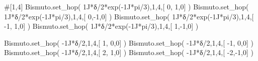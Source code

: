 \documentclass[
  letterpaper,
  DIV=11,
  numbers=noendperiod]{scrreprt}
\newenvironment{Shaded}{\begin{snugshade}}{\end{snugshade}}
\newcommand{\CommentTok}[1]{\textcolor[rgb]{0.37,0.37,0.37}{#1}}
\newcommand{\DecValTok}[1]{\textcolor[rgb]{0.68,0.00,0.00}{#1}}
\newcommand{\NormalTok}[1]{\textcolor[rgb]{0.00,0.23,0.31}{#1}}
\newcommand{\OperatorTok}[1]{\textcolor[rgb]{0.37,0.37,0.37}{#1}}
\newcommand{\OtherTok}[1]{\textcolor[rgb]{0.00,0.23,0.31}{#1}}
\begin{document}
\begin{Shaded}
\begin{Highlighting}[]
\CommentTok{\#[1,4]}
\NormalTok{Bismuto.set\_hop(  }\OtherTok{1J}\OperatorTok{*}\NormalTok{δ}\OperatorTok{/}\DecValTok{2}\OperatorTok{*}\NormalTok{exp(}\OperatorTok{{-}}\OtherTok{1J}\OperatorTok{*}\NormalTok{pi}\OperatorTok{/}\DecValTok{3}\NormalTok{),}\DecValTok{1}\NormalTok{,}\DecValTok{4}\NormalTok{,[  }\DecValTok{0}\NormalTok{, }\DecValTok{1}\NormalTok{,}\DecValTok{0}\NormalTok{] ) }
\NormalTok{Bismuto.set\_hop(  }\OtherTok{1J}\OperatorTok{*}\NormalTok{δ}\OperatorTok{/}\DecValTok{2}\OperatorTok{*}\NormalTok{exp(}\OperatorTok{{-}}\OtherTok{1J}\OperatorTok{*}\NormalTok{pi}\OperatorTok{/}\DecValTok{3}\NormalTok{),}\DecValTok{1}\NormalTok{,}\DecValTok{4}\NormalTok{,[  }\DecValTok{0}\NormalTok{,}\OperatorTok{{-}}\DecValTok{1}\NormalTok{,}\DecValTok{0}\NormalTok{] )}
\NormalTok{Bismuto.set\_hop(  }\OtherTok{1J}\OperatorTok{*}\NormalTok{δ}\OperatorTok{/}\DecValTok{2}\OperatorTok{*}\NormalTok{exp(}\OperatorTok{{-}}\OtherTok{1J}\OperatorTok{*}\NormalTok{pi}\OperatorTok{/}\DecValTok{3}\NormalTok{),}\DecValTok{1}\NormalTok{,}\DecValTok{4}\NormalTok{,[ }\OperatorTok{{-}}\DecValTok{1}\NormalTok{, }\DecValTok{1}\NormalTok{,}\DecValTok{0}\NormalTok{] )  }
\NormalTok{Bismuto.set\_hop(  }\OtherTok{1J}\OperatorTok{*}\NormalTok{δ}\OperatorTok{/}\DecValTok{2}\OperatorTok{*}\NormalTok{exp(}\OperatorTok{{-}}\OtherTok{1J}\OperatorTok{*}\NormalTok{pi}\OperatorTok{/}\DecValTok{3}\NormalTok{),}\DecValTok{1}\NormalTok{,}\DecValTok{4}\NormalTok{,[  }\DecValTok{1}\NormalTok{,}\OperatorTok{{-}}\DecValTok{1}\NormalTok{,}\DecValTok{0}\NormalTok{] ) }

\NormalTok{Bismuto.set\_hop( }\OperatorTok{{-}}\OtherTok{1J}\OperatorTok{*}\NormalTok{δ}\OperatorTok{/}\DecValTok{2}\NormalTok{,}\DecValTok{1}\NormalTok{,}\DecValTok{4}\NormalTok{,[  }\DecValTok{1}\NormalTok{, }\DecValTok{0}\NormalTok{,}\DecValTok{0}\NormalTok{] ) }
\NormalTok{Bismuto.set\_hop( }\OperatorTok{{-}}\OtherTok{1J}\OperatorTok{*}\NormalTok{δ}\OperatorTok{/}\DecValTok{2}\NormalTok{,}\DecValTok{1}\NormalTok{,}\DecValTok{4}\NormalTok{,[ }\OperatorTok{{-}}\DecValTok{1}\NormalTok{, }\DecValTok{0}\NormalTok{,}\DecValTok{0}\NormalTok{] )}
\NormalTok{Bismuto.set\_hop( }\OperatorTok{{-}}\OtherTok{1J}\OperatorTok{*}\NormalTok{δ}\OperatorTok{/}\DecValTok{2}\NormalTok{,}\DecValTok{1}\NormalTok{,}\DecValTok{4}\NormalTok{,[  }\DecValTok{2}\NormalTok{, }\DecValTok{1}\NormalTok{,}\DecValTok{0}\NormalTok{] )  }
\NormalTok{Bismuto.set\_hop( }\OperatorTok{{-}}\OtherTok{1J}\OperatorTok{*}\NormalTok{δ}\OperatorTok{/}\DecValTok{2}\NormalTok{,}\DecValTok{1}\NormalTok{,}\DecValTok{4}\NormalTok{,[ }\OperatorTok{{-}}\DecValTok{2}\NormalTok{,}\OperatorTok{{-}}\DecValTok{1}\NormalTok{,}\DecValTok{0}\NormalTok{] ) }


\end{Highlighting}
\end{Shaded}
\end{document}
